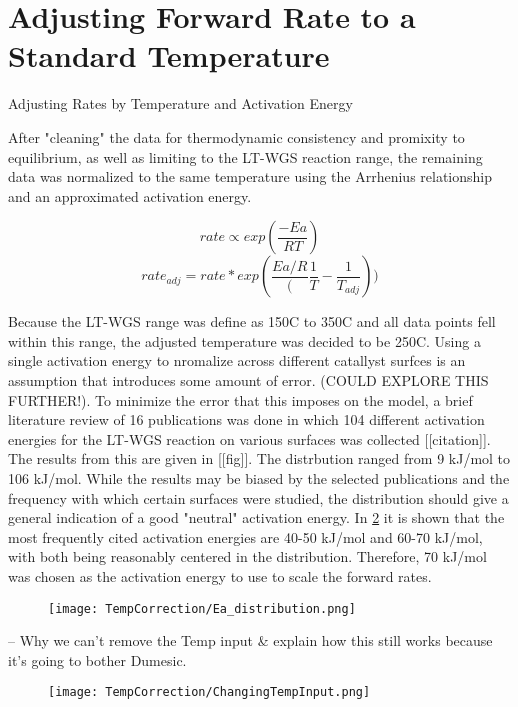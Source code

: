 \chapter*{Adjusting Forward Rate to a Standard Temperature}

Adjusting Rates by Temperature and Activation Energy

	After "cleaning" the data for thermodynamic consistency and promixity to equilibrium, as well as limiting to the LT-WGS reaction range, the remaining data was normalized to the same temperature using the Arrhenius relationship and an approximated activation energy. 

	\begin{equation}
		rate \propto exp(\frac{-Ea}{RT}) \end{equation}
	\begin{equation}
		rate_{adj} = rate * exp(\frac{Ea/R}(\frac{1}{T} - \frac{1}{T_{adj}})) \end{equation}


	Because the LT-WGS range was define as 150C to 350C and all data points fell within this range, the adjusted temperature was decided to be 250C. Using a single activation energy to nromalize across different catallyst surfces is an assumption that introduces some amount of error. (COULD EXPLORE THIS FURTHER!). To minimize the error that this imposes on the model, a brief literature review of 16 publications was done in which 104 different activation energies for the LT-WGS reaction on various surfaces was collected [[citation]]. The results from this are given in [[fig]]. The distrbution ranged from 9 kJ/mol to 106 kJ/mol. While the results may be biased by the selected publications and the frequency with which certain surfaces were studied, the distribution should give a general indication of a good "neutral" activation energy. In \ref{fig:Ea_dist} it is shown that the most frequently cited activation energies are 40-50 kJ/mol and 60-70 kJ/mol, with both being reasonably centered in the distribution. Therefore, 70 kJ/mol was chosen as the activation energy to use to scale the forward rates. 

	\begin{figure}[]
		\centering
		\texttt{[image: TempCorrection/Ea\_distribution.png]}
		\caption{}
		\label{fig:Ea_dist}
	\end{figure}

	-- Why we can't remove the Temp input \& explain how this still works because it's going to bother Dumesic. 
	\begin{figure}[]
		\centering
		\texttt{[image: TempCorrection/ChangingTempInput.png]}
		\caption{}
		\label{fig:Ea_dist}
	\end{figure}